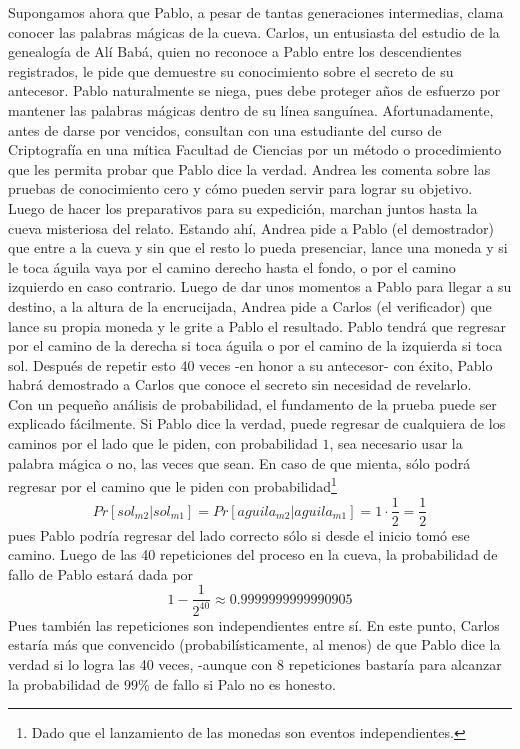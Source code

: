 \documentclass[oneside,10pt]{article}
\begin{document}
Supongamos ahora que Pablo, a pesar de tantas generaciones intermedias, clama conocer las palabras mágicas de la cueva. Carlos, un entusiasta del estudio de la 
genealogía de Alí Babá, quien no reconoce a Pablo entre los descendientes registrados, le pide que demuestre su conocimiento
sobre el secreto de su antecesor. Pablo naturalmente se niega, pues debe proteger años de esfuerzo
por mantener las palabras mágicas dentro de su línea sanguínea. Afortunadamente, antes de darse por
vencidos, consultan con una estudiante del curso de Criptografía en una mítica Facultad de
Ciencias por
un método o procedimiento que les permita probar que Pablo dice la verdad. Andrea les comenta sobre las pruebas de conocimiento cero y cómo pueden servir para lograr su objetivo. Luego de hacer los preparativos para su expedición, marchan juntos hasta la cueva misteriosa del relato.
Estando ahí, Andrea pide a Pablo (el demostrador) que entre a la cueva y sin que el resto lo pueda presenciar, lance una moneda y si le toca águila vaya por el camino derecho hasta el fondo, o por el camino izquierdo
en caso contrario. Luego de dar unos momentos a Pablo para llegar a su destino, a la altura de la encrucijada,  Andrea pide a Carlos (el verificador) que lance su propia moneda y le grite a Pablo el resultado. Pablo tendrá que regresar por el camino de la derecha si toca águila o por el camino de la izquierda si toca sol. Después de repetir esto 40 veces -en honor a su antecesor- con éxito, Pablo habrá demostrado a Carlos que
conoce el secreto sin necesidad de revelarlo.\\
Con un pequeño análisis de probabilidad, el fundamento de la prueba puede ser explicado fácilmente.
Si Pablo dice la verdad, puede regresar de cualquiera de los caminos por el lado que le piden, con probabilidad $1$, sea necesario usar la palabra mágica o no, las veces que sean. En caso de que mienta, sólo podrá regresar
por el camino que le piden con probabilidad\footnote{Dado que el lanzamiento de las monedas son eventos independientes.}
\begin{equation}
  Pr[sol_{m2}|sol_{m1}] = Pr[aguila_{m2}|aguila_{m1}] = 1 \cdot \frac{1}{2} = \frac{1}{2}
\end{equation}
pues Pablo podría regresar del lado correcto sólo si desde el inicio tomó ese camino. Luego de las
40 repeticiones del proceso en la cueva, la probabilidad de fallo de Pablo estará dada por
\begin{equation}
  1 - \frac{1}{2^{40}} \approx 0.9999999999990905
\end{equation}
Pues también las repeticiones son independientes entre sí. En este punto, Carlos estaría más que convencido (probabilísticamente, al menos) de que Pablo dice la verdad si lo logra las 40 veces, -aunque con 8 repeticiones bastaría para
alcanzar la probabilidad de 99\% de fallo si Palo no es honesto.
\end{document}
